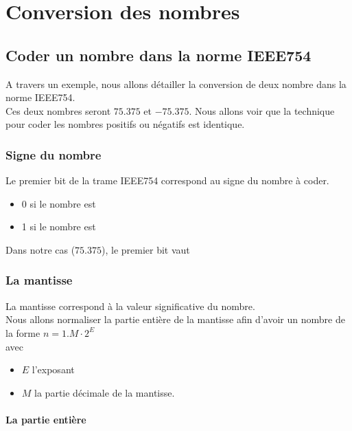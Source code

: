 \chapter{Conversion des nombres}     

\section{Coder un nombre dans la norme IEEE754}

A travers un exemple, nous allons détailler la conversion de deux nombre dans la norme IEEE754. \\
Ces deux nombres seront $75.375$ et $-75.375$. Nous allons voir que la technique pour coder les nombres positifs ou négatifs est identique.

\subsection{Signe du nombre}

Le premier bit de la trame IEEE754 correspond au signe du nombre à coder.

\begin{itemize}
	\item 0 si le nombre est 
	\item 1 si le nombre est 

\end{itemize}

Dans notre cas ($75.375$), le premier bit vaut 

\subsection{La mantisse}

La mantisse correspond à la valeur significative du nombre. \\ 
Nous allons normaliser la partie entière de la mantisse afin d'avoir un nombre de la forme $n = 1.M \cdot 2^E$ \\

avec 
\begin{itemize}

\item $E$ l'exposant
\item $M$ la partie décimale de la mantisse.
\end{itemize}



\subsubsection{La partie entière}

